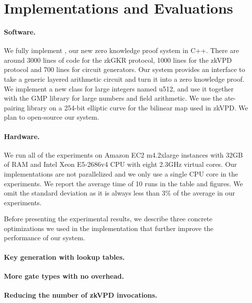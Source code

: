 
\section{Implementations and Evaluations}\label{sec:eval}

\paragraph{Software.} We fully implement \name, our new zero knowledge proof system in C++. There are around 3000 lines of code for the zkGKR protocol, 1000 lines for the zkVPD protocol and 700 lines for circuit generators. Our system provides an interface to take a generic layered arithmetic circuit and turn it into a zero knowledge proof. We implement a new class for large integers named u512, and use it together with the GMP\cite{GNU} library for large numbers and field arithmetic. We use the ate-pairing\cite{ate-pairing} library on a 254-bit elliptic curve for the bilinear map used in zkVPD. We plan to open-source our system.

\paragraph{Hardware.} We run all of the experiments on Amazon EC2 m4.2xlarge instances with 32GB of RAM and Intel Xeon E5-2686v4 CPU with eight 2.3GHz virtual cores. Our implementations are not parallelized and we only use a single CPU core in the experiments. We report the average time of 10 runs in the table and figures. We omit the standard deviation as it is always less than 3\% of the average in our experiments.


Before presenting the experimental results, we describe three concrete optimizations we used in the implementation that further improve the performance of our system.

\paragraph{Key generation with lookup tables.}

\paragraph{More gate types with no overhead.}

\paragraph{Reducing the number of zkVPD invocations.}

